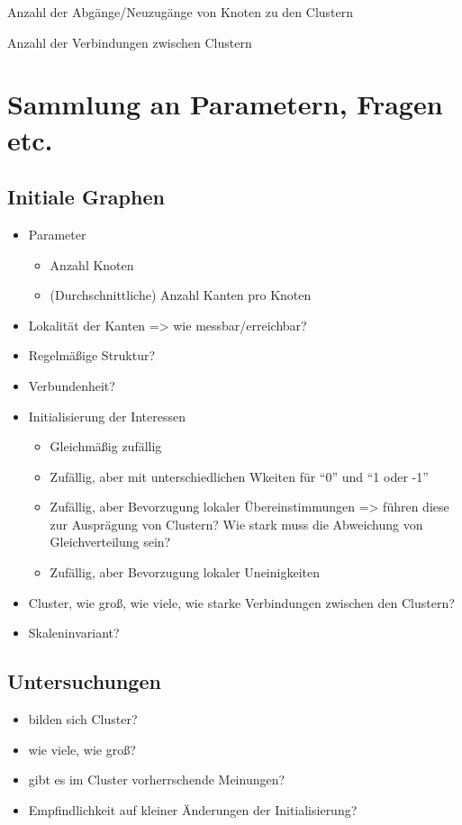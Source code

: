 \documentclass[11pt, a4paper]{scrartcl}
\begin{document}
Anzahl der Abgänge/Neuzugänge von Knoten zu den Clustern

Anzahl der Verbindungen zwischen Clustern

\printbibliography

\appendix
\section{Sammlung an Parametern, Fragen etc.}
\subsection{Initiale Graphen}
\begin{itemize}
\item Parameter\begin{itemize}
	\item Anzahl Knoten
	\item (Durchschnittliche) Anzahl Kanten pro Knoten
\end{itemize}
\item Lokalität der Kanten => wie messbar/erreichbar?
\item Regelmäßige Struktur?
\item Verbundenheit?
\item Initialisierung der Interessen\begin{itemize}
	\item Gleichmäßig zufällig
	\item Zufällig, aber mit unterschiedlichen Wkeiten für "`0"' und "`1 oder -1"'
	\item Zufällig, aber Bevorzugung lokaler Übereinstimmungen => führen diese zur Ausprägung von Clustern? Wie stark muss die Abweichung von Gleichverteilung sein?
	\item Zufällig, aber Bevorzugung lokaler Uneinigkeiten
\end{itemize}
\item Cluster, wie groß, wie viele, wie starke Verbindungen zwischen den Clustern?
\item Skaleninvariant?
\end{itemize}

\subsection{Untersuchungen}
\begin{itemize}
\item bilden sich Cluster?
\item wie viele, wie groß?
\item gibt es im Cluster vorherrschende Meinungen?
\item Empfindlichkeit auf kleiner Änderungen der Initialisierung?
\end{itemize}
\end{document}
